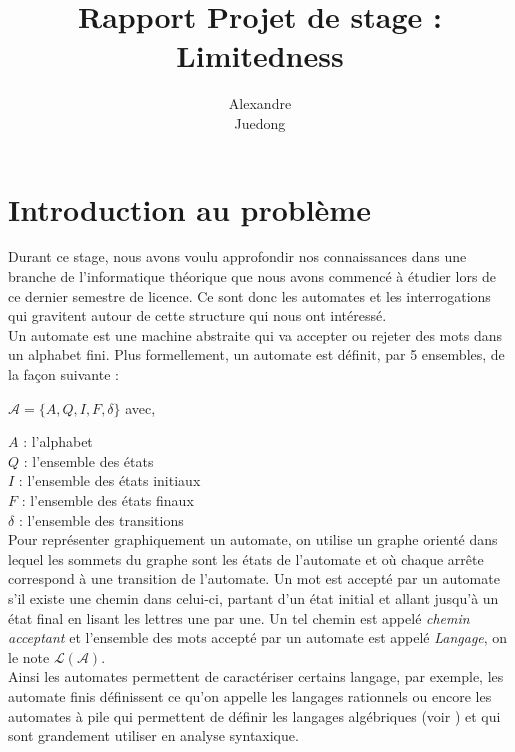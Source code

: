 \documentclass{report}
\title{\textbf{Rapport Projet de stage : Limitedness}}
\author{
\bsc {Brebant} Alexandre\\
\bsc {Xue} Juedong}
\begin{document}
\maketitle

\newcommand{\Aut}{\mathcal{A}}

\tableofcontents
\chapter*{Introduction au problème}
Durant ce stage, nous avons voulu approfondir nos connaissances dans une branche de l'informatique théorique que nous avons commencé à étudier lors de ce dernier semestre de licence. Ce sont donc les automates et les interrogations qui gravitent autour de cette structure qui nous ont intéressé.\\
Un automate est une machine abstraite qui va accepter ou rejeter des mots dans un alphabet fini. Plus formellement, un automate est définit, par 5 ensembles, de la façon suivante : \\
\begin{center}
 $ \Aut = \{ A, Q, I, F, \delta \} $     avec,
 \end{center}
$A$ : l’alphabet\\
$Q$ : l'ensemble des états\\
$I$ : l'ensemble des états initiaux\\
$F$ : l'ensemble des états finaux\\
$\delta$ : l'ensemble des transitions\\

Pour représenter graphiquement un automate, on utilise un graphe orienté dans lequel les sommets du graphe sont les états de l'automate et où chaque arrête correspond à une transition de l'automate. Un mot est accepté par un automate s'il existe une chemin dans celui-ci, partant d'un état initial et allant jusqu'à un état final en lisant les lettres une par une. Un tel chemin est appelé \textit{chemin acceptant} et l'ensemble des mots accepté par un automate est appelé \textit{Langage}, on le note $\mathcal{L}(\Aut)$.\\

Ainsi les automates permettent de caractériser certains langage, par exemple, les automate finis définissent ce qu'on appelle les langages rationnels ou encore les automates à pile qui permettent de définir les langages algébriques (voir \cite{Elements-d-algorithmique}) et qui sont grandement utiliser en analyse syntaxique.
\\
\end{document}
